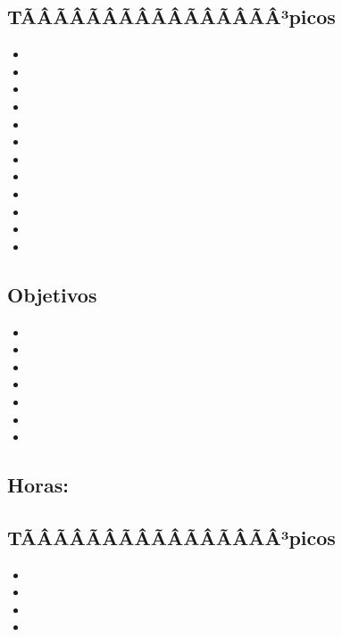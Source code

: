 \subsection*{TÃÂÃÂÃÂÃÂÃÂÃÂÃÂÃÂ³picos}
\begin{itemize}
	\item \ALTRESTopicAlgoritmos
	\item \ALTRESTopicBusqueda
	\item \ALTRESTopicAlgoritmoscuadraticos
	\item \ALTRESTopicAlgoritmosde
	\item \ALTRESTopicTablas
	\item \ALTRESTopicArboles
	\item \ALTRESTopicRepresentacion
	\item \ALTRESTopicRecorridos
	\item \ALTRESTopicEl
	\item \ALTRESTopicCerradura
	\item \ALTRESTopicArbol
	\item \ALTRESTopicOrdenamiento
\end{itemize}

\subsection*{Objetivos}
\begin{itemize}
	\item \ALTRESObjUNO
	\item \ALTRESObjDOS
	\item \ALTRESObjTRES
	\item \ALTRESObjCUATRO
	\item \ALTRESObjCINCO
	\item \ALTRESObjSEIS
	\item \ALTRESObjSIETE
\end{itemize}

\subsection{\ALCUATRODef}\label{sec:BOK-AL4}
\subsection*{Horas: \ALCUATROHours}

\subsection*{TÃÂÃÂÃÂÃÂÃÂÃÂÃÂÃÂ³picos}
\begin{itemize}
	\item \ALCUATROTopicConsenso
	\item \ALCUATROTopicDeteccion
	\item \ALCUATROTopicTolerancia
	\item \ALCUATROTopicEstabilizacion
\end{itemize}

